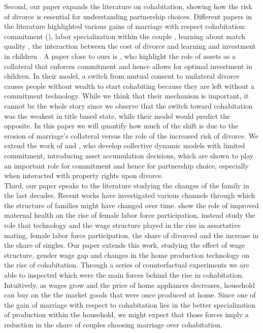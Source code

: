 \documentclass[12pt]{article}
\numberwithin{table}{section}
\begin{document}
Second, our paper expands the literature on cohabitation, showing how the risk of divorce is essential for understanding partnership choices. Different papers in the literature highlighted various gains of marriage with respect cohabitation: commitment (\citealp{matouschek2008}), labor specialization within the couple \cite{gemici2014}, learning about match quality \cite{brien2006}, the interaction between the cost of divorce and learning \cite{blasutto2020} and  investment in children \cite{lafortune2019}. A paper close to ours is \cite{lafortune2019}, who highlight the role of assets as a collateral that enforces commitment and hence allows for optimal investment in children. In their model, a switch from mutual consent to unilateral divorce causes people without wealth to start cohabiting because they are left without a commitment technology. While we think that their mechanism is important, it cannot be the whole story since we observe that the switch toward cohabitation was the weakest in title based state, while their model would predict the opposite. In this paper we will quantify how much of the shift is due to the erosion of marriage's collateral versus the role of the increased risk of divorce. We extend the work of \cite{gemici2014} and \cite{blasutto2020}, who develop collective dynamic models with limited commitment, introducing asset accumulation decisions, which are shown to play an important role for commitment and hence for partnership choice, especially when interacted with property rights upon divorce.\\
Third, our paper speaks to the literature studying the changes of the family in the last decades. Recent works have investigated various channels through which the structure of families might have changed over time. \cite{albanesi2016} show the role of improved maternal health on the rise of female labor force participation, \cite{greenwood2016} instead study the role that technology and the wage structure played in the rise in assortative mating, female labor force participation, the share of divorced and the increase in the share of singles. Our paper extends this work, studying the effect of wage structure, gender wage gap and changes in the home production technology on the rise of cohabitation. Through a series of counterfactual experiments we are able to inspected which were the main forces behind the rise in cohabitation. Intuitively, as wages grow and the price of home appliances decreases, household can buy on the the market goods that were once produced at home. Since one of the gain of marriage with respect to cohabitation lies in the better specialization of production within the household, we might expect that those forces imply a reduction in the share of couples choosing marriage over cohabitation.
\end{document}

